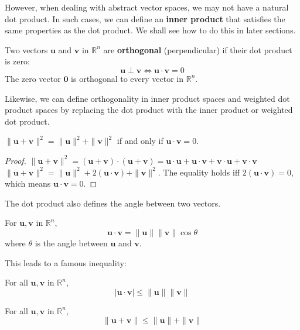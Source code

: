 \documentclass[oneside]{book}
\begin{document}
However, when dealing with abstract vector spaces, we may not have a natural dot product. In such cases, we can define an \textbf{inner product} that satisfies the same properties as the dot product. We shall see how to do this in later sections.

\begin{definition}[Orthogonality]
Two vectors $\mathbf{u}$ and $\mathbf{v}$ in $\mathbb{R}^n$ are \textbf{orthogonal} (perpendicular) if their dot product is zero:
\[ \mathbf{u} \perp \mathbf{v} \iff \mathbf{u} \cdot \mathbf{v} = 0 \]
The zero vector $\mathbf{0}$ is orthogonal to every vector in $\mathbb{R}^n$.
\end{definition}

Likewise, we can define orthogonality in inner product spaces and weighted dot product spaces by replacing the dot product with the inner product or weighted dot product.

\begin{theorem}
$\|\mathbf{u} + \mathbf{v}\|^2 = \|\mathbf{u}\|^2 + \|\mathbf{v}\|^2$ if and only if $\mathbf{u} \cdot \mathbf{v} = 0$.
\end{theorem}
\begin{proof}
$\|\mathbf{u} + \mathbf{v}\|^2 = (\mathbf{u} + \mathbf{v}) \cdot (\mathbf{u} + \mathbf{v}) = \mathbf{u} \cdot \mathbf{u} + \mathbf{u} \cdot \mathbf{v} + \mathbf{v} \cdot \mathbf{u} + \mathbf{v} \cdot \mathbf{v}$
$\|\mathbf{u} + \mathbf{v}\|^2 = \|\mathbf{u}\|^2 + 2(\mathbf{u} \cdot \mathbf{v}) + \|\mathbf{v}\|^2$.
The equality holds iff $2(\mathbf{u} \cdot \mathbf{v}) = 0$, which means $\mathbf{u} \cdot \mathbf{v} = 0$.
\end{proof}

The dot product also defines the angle between two vectors.

\begin{theorem}
For $\mathbf{u}, \mathbf{v}$ in $\mathbb{R}^n$,
\[ \mathbf{u} \cdot \mathbf{v} = \|\mathbf{u}\| \|\mathbf{v}\| \cos\theta \]
where $\theta$ is the angle between $\mathbf{u}$ and $\mathbf{v}$.
\end{theorem}
This leads to a famous inequality:
\begin{theorem}
For all $\mathbf{u}, \mathbf{v}$ in $\mathbb{R}^n$,
\[ |\mathbf{u} \cdot \mathbf{v}| \le \|\mathbf{u}\| \|\mathbf{v}\| \]
\end{theorem}
\begin{theorem}
For all $\mathbf{u}, \mathbf{v}$ in $\mathbb{R}^n$,
\[ \|\mathbf{u} + \mathbf{v}\| \le \|\mathbf{u}\| + \|\mathbf{v}\| \]
\end{theorem}
\end{document}
